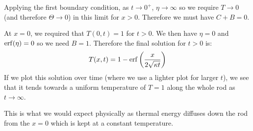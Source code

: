 \documentclass[../main.tex]{subfiles}
\begin{document}
\begin{example}
  Applying the first boundary condition, as $t \to 0^{+}$, $\eta \to \infty$ so we require $T \to 0$ (and therefore $\Theta \to 0$) in this limit for $x > 0$.
  Therefore we must have $C + B = 0$.

  At $x = 0$, we required that $T(0, t) = 1$ for $t > 0$.
  We then have $\eta = 0$ and $\operatorname{erf}(\eta) = 0$ so we need $B = 1$.
  Therefore the final solution for $t > 0$ is:
  \[
    T(x, t) = 1 - \operatorname{erf}\left(\frac{x}{2\sqrt{\kappa t}}\right)
  \]
  If we plot this solution over time (where we use a lighter plot for larger $t$), we see that it tends towards a uniform temperature of $T = 1$ along the whole rod as $t \to \infty$.
  \begin{center}
  \end{center}
  This is what we would expect physically as thermal energy diffuses down the rod from the $x = 0$ which is kept at a constant temperature.
\end{example}
\end{document}
